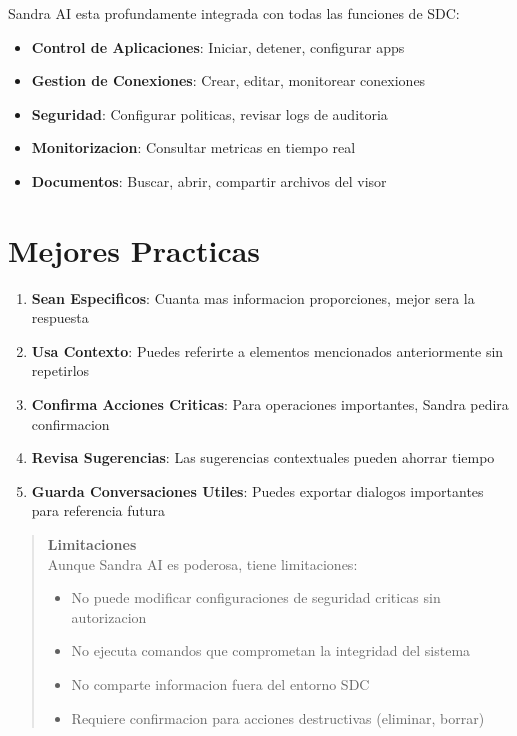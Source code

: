 Sandra AI esta profundamente integrada con todas las funciones de SDC:

\begin{itemize}[leftmargin=*]
    \item \textbf{Control de Aplicaciones}: Iniciar, detener, configurar apps
    \item \textbf{Gestion de Conexiones}: Crear, editar, monitorear conexiones
    \item \textbf{Seguridad}: Configurar politicas, revisar logs de auditoria
    \item \textbf{Monitorizacion}: Consultar metricas en tiempo real
    \item \textbf{Documentos}: Buscar, abrir, compartir archivos del visor
\end{itemize}

\section{Mejores Practicas}
\label{sec:mejores-practicas-chat}

\begin{enumerate}[leftmargin=*]
    \item \textbf{Sean Especificos}: Cuanta mas informacion proporciones, mejor sera la respuesta
    \item \textbf{Usa Contexto}: Puedes referirte a elementos mencionados anteriormente sin repetirlos
    \item \textbf{Confirma Acciones Criticas}: Para operaciones importantes, Sandra pedira confirmacion
    \item \textbf{Revisa Sugerencias}: Las sugerencias contextuales pueden ahorrar tiempo
    \item \textbf{Guarda Conversaciones Utiles}: Puedes exportar dialogos importantes para referencia futura
\end{enumerate}

\begin{quote}
\textbf{Limitaciones}\\
Aunque Sandra AI es poderosa, tiene limitaciones:
\begin{itemize}
    \item No puede modificar configuraciones de seguridad criticas sin autorizacion
    \item No ejecuta comandos que comprometan la integridad del sistema
    \item No comparte informacion fuera del entorno SDC
    \item Requiere confirmacion para acciones destructivas (eliminar, borrar)
\end{itemize}
\end{quote}

